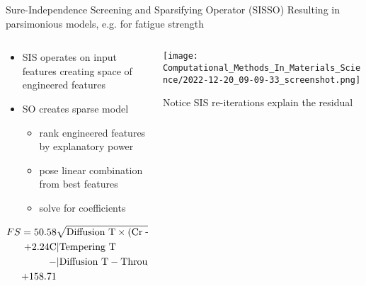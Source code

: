 \documentclass[10pt, aspectratio=169, presentation]{beamer}
\begin{document}
\begin{frame}[label={sec:org9836bfe}]{Sure-Independence Screening and Sparsifying Operator (SISSO)}
Resulting in parsimonious models, e.g. for fatigue strength\autocite{he-2021-learn-inter}
\begin{columns}
\begin{column}{0.45\columnwidth}
\begin{itemize}
\item SIS operates on input features creating space of engineered features
\item SO creates sparse model
\begin{itemize}
\item rank engineered features by explanatory power
\item pose linear combination from best features
\item solve for coefficients
\end{itemize}
\end{itemize}

\begin{align*}
FS = 50.58 &\sqrt{\mbox{Diffusion T} \times (\ce{Cr} + \ce{Ni})}\\
 + 2.24 \ce{C} &|\mbox{Tempering T}\\
 - &|\mbox{Diffusion T} - \mbox{Through-Harden T}||\\
 + 158.71
\end{align*}
\end{column}

\begin{column}{0.55\columnwidth}
\begin{center}
\texttt{[image: Computational\_Methods\_In\_Materials\_Science/2022-12-20\_09-09-33\_screenshot.png]}
\end{center}
Notice SIS re-iterations explain the residual\autocite{ghiringhelli-2017-learn-physic}
\end{column}
\end{columns}
\end{frame}
\end{document}
